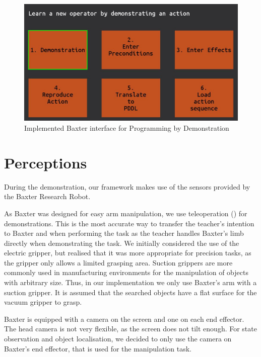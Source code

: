   \begin{figure}[h]
    \centering
    \includegraphics[scale=0.5]{figures/interface}
    \caption{Implemented Baxter interface for Programming by Demonstration}
    \label{fig:interface}
  \end{figure}



\section{Perceptions}
During the demonstration, our framework makes use of the sensors provided by the Baxter Research Robot.

As Baxter was designed for easy arm manipulation, we use teleoperation () for demonstrations.
This is the most accurate way to transfer the teacher's intention to Baxter and when performing the task as the teacher handles Baxter's limb directly when demonstrating the task.
We initially considered the use of the electric gripper, but realised that it was more appropriate for precision tasks, as the gripper only allows a limited grasping area.
Suction grippers are more commonly used in manufacturing environments for the manipulation of objects with arbitrary size.
Thus, in our implementation we only use Baxter's arm with a suction gripper.
It is assumed that the searched objects have a flat surface for the vacuum gripper to grasp.

Baxter is equipped with a camera on the screen and one on each end effector.
The head camera is not very flexible, as the screen does not tilt enough.
For state observation and object localisation, we decided to only use the camera on Baxter's end effector, that is used for the manipulation task.
 
